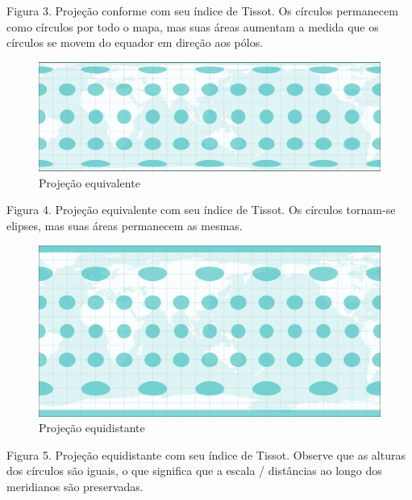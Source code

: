\documentclass[
]{krantz}
\begin{document}
Figura 3. Projeção conforme com seu índice de Tissot. Os círculos permanecem como círculos por todo o mapa, mas suas áreas aumentam a medida que os círculos se movem do equador em direção aos pólos.

\begin{figure}
\centering
\includegraphics{media/modulo0/authalic.png}
\caption{Projeção equivalente}
\end{figure}

Figura 4. Projeção equivalente com seu índice de Tissot. Os círculos tornam-se elipses, mas suas áreas permanecem as mesmas.

\begin{figure}
\centering
\includegraphics{media/modulo0/equidistant.png}
\caption{Projeção equidistante}
\end{figure}

Figura 5. Projeção equidistante com seu índice de Tissot. Observe que as alturas dos círculos são iguais, o que significa que a escala / distâncias ao longo dos meridianos são preservadas.
\end{document}
